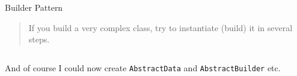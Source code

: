 \begin{frame}[t]{Builder Pattern}
	\begin{quote}
		If you build a very complex class, try to instantiate (build) it in several steps.
	\end{quote}
	
	\inputminted{python}{code/patterns/creational/builder_best.py}
	And of course I could now create \texttt{AbstractData} and \texttt{AbstractBuilder} etc.
\end{frame} 